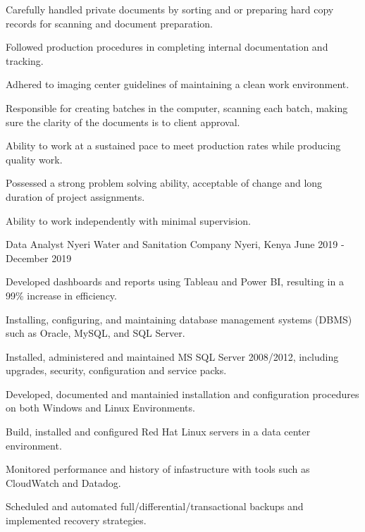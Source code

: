 \begin{cventries}
{\begin{cvitems}
        \item {Carefully handled private documents by sorting and or preparing hard copy records for scanning and document preparation.}
        \item {Followed production procedures in completing internal documentation and tracking.}
        \item {Adhered to imaging center guidelines of maintaining a clean work environment.}
        \item {Responsible for creating batches in the computer, scanning each batch, making sure the clarity of the documents is to client approval.}
        \item {Ability to work at a sustained pace to meet production rates while producing quality work.}
        \item {Possessed a strong problem solving ability, acceptable of change and long duration of project assignments.}
        \item {Ability to work independently with minimal supervision.}
      \end{cvitems}
    }
  \cventry
    {Data Analyst} %
    {Nyeri Water and Sanitation Company} %
    {Nyeri, Kenya} %
    {June 2019 - December 2019} %
    {
      \begin{cvitems} %
        \item {Developed dashboards and reports using Tableau and Power BI, resulting in a 99\% increase in efficiency.}
        \item {Installing, configuring, and maintaining database management systems (DBMS) such as Oracle, MySQL, and SQL Server.}
        \item {Installed, administered and maintained MS SQL Server 2008/2012, including upgrades, security, configuration and service packs.}
        \item {Developed, documented and mantainied installation and configuration procedures on both Windows and Linux Environments.}
        \item {Build, installed and configured Red Hat Linux servers in a data center environment.}
        \item {Monitored performance and history of infastructure with tools such as CloudWatch and Datadog.}
        \item {Scheduled and automated full/differential/transactional backups and implemented recovery strategies.}

\end{cvitems}}
\end{cventries}
